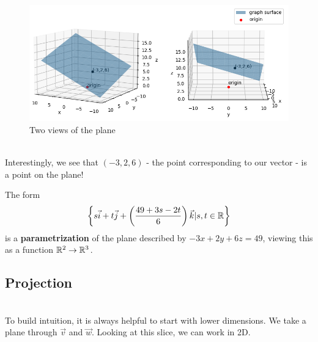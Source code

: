 \begin{figure}[h]
	\centering
	\includegraphics[width=\textwidth]{coordinate_geometry/plane2.png}
	\caption{Two views of the plane}
\end{figure}\ \\

Interestingly, we see that $(-3,2,6)$ - the point corresponding to our vector - is a point on the plane!
\begin{remark}
	The form \[
		\left\{s \vec{i}+t \vec{j}+\left(\frac{49+3s - 2t}{6}\right) \vec{k} | s,t\in\mathbb{R}\right\}
	\] is a \textbf{parametrization} of the plane described by $-3x+2y+6z=49$, viewing this as a function $\mathbb{R}^2\to\mathbb{R}^3$.
\end{remark}
\subsection{Projection}
\ \\

To build intuition, it is always helpful to start with lower dimensions. We take a plane through $\vec{v}$ and $\vec{w}$. Looking at this slice, we can work in 2D.


